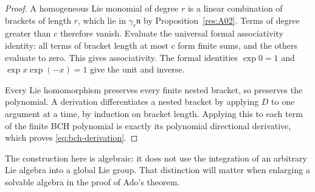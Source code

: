 \begin{proof}
A homogeneous Lie monomial of degree \(r\) is a linear
combination of brackets of length \(r\), which lie in
\(\gamma_r\mathfrak n\) by Proposition~\ref{res:A02}.
Terms of degree greater than \(c\) therefore vanish.
Evaluate the universal formal associativity identity:
all terms of bracket length at most \(c\) form finite sums,
and the others evaluate to zero. This gives associativity.
The formal identities \(\exp0=1\) and
\(\exp x\exp(-x)=1\) give the unit and inverse.

Every Lie homomorphism preserves every finite nested bracket,
so preserves the polynomial. A derivation differentiates a
nested bracket by applying \(D\) to one argument at a time,
by induction on bracket length. Applying this to each term
of the finite BCH polynomial is exactly its polynomial
directional derivative, which proves \eqref{eq:bch-derivation}.
\end{proof}

The construction here is algebraic: it does not use the
integration of an arbitrary Lie algebra into a global Lie
group. That distinction will matter when enlarging a
solvable algebra in the proof of Ado's theorem.
